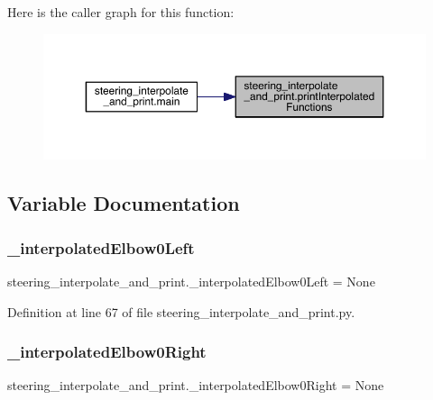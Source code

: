 Here is the caller graph for this function\+:\nopagebreak
\begin{figure}[H]
\begin{center}
\leavevmode
\includegraphics[width=350pt]{namespacesteering__interpolate__and__print_a43ddc2f8fb0425e973a504a5d38289c2_icgraph}
\end{center}
\end{figure}


\subsection{Variable Documentation}
\mbox{\label{namespacesteering__interpolate__and__print_a523a7087a95e5bc05c35455b293f7efb}} 
\subsubsection{\texorpdfstring{\_interpolatedElbow0Left}{\_interpolatedElbow0Left}}
{\footnotesize\ttfamily steering\+\_\+interpolate\+\_\+and\+\_\+print.\+\_\+interpolated\+Elbow0\+Left = None\hspace{0.3cm}{\ttfamily [private]}}



Definition at line 67 of file steering\+\_\+interpolate\+\_\+and\+\_\+print.\+py.

\mbox{\label{namespacesteering__interpolate__and__print_a662b8bcfba342c150cec7500a5bc3791}} 
\subsubsection{\texorpdfstring{\_interpolatedElbow0Right}{\_interpolatedElbow0Right}}
{\footnotesize\ttfamily steering\+\_\+interpolate\+\_\+and\+\_\+print.\+\_\+interpolated\+Elbow0\+Right = None\hspace{0.3cm}{\ttfamily [private]}}




